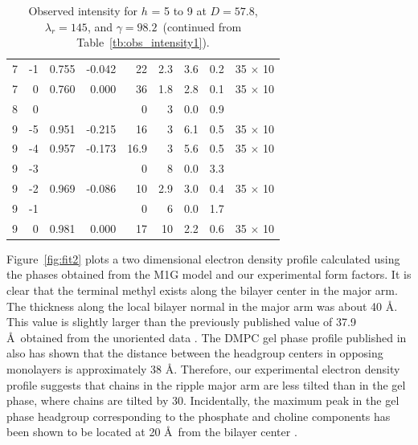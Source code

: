 \begin{table}[htbp]
\begin{tabular}{rrrrrrrrc}
7     & -1    & 0.755 & -0.042 & 22    & 2.3   & 3.6   & 0.2   & 35 $\times$ 10 \\
7     & 0     & 0.760 & 0.000 & 36    & 1.8   & 2.8   & 0.1   & 35 $\times$ 10 \\
8     & 0     &       &       & 0     & 3     & 0.0   & 0.9   &  \\
9     & -5    & 0.951 & -0.215 & 16    & 3     & 6.1   & 0.5   & 35 $\times$ 10 \\
9     & -4    & 0.957 & -0.173 & 16.9  & 3     & 5.6   & 0.5   & 35 $\times$ 10 \\
9     & -3    &       &       & 0     & 8     & 0.0   & 3.3   &  \\
9     & -2    & 0.969 & -0.086 & 10    & 2.9   & 3.0   & 0.4   & 35 $\times$ 10 \\
9     & -1    &       &       & 0     & 6     & 0.0   & 1.7   &  \\
9     & 0     & 0.981 & 0.000 & 17    & 10    & 2.2   & 0.6   & 35 $\times$ 10 \\
    \hline
  \end{tabular}
  \caption{Observed intensity for $h$ = 5 to 9 at $D=57.8$, $\lambda_r=145$, and 
  $\gamma=98.2$\textdegree\ (continued from Table~\ref{tb:obs_intensity1}).}
  \label{tb:obs_intensity2}
\end{table}

Figure~\ref{fig:fit2} plots a two dimensional electron density profile calculated
using the phases obtained from the M1G model and our experimental form factors.
It is clear that the terminal methyl exists along the bilayer 
center in the major arm. The thickness along the local bilayer normal
in the major arm was about 40 \AA. This value is slightly larger than
the previously published value of 37.9 \AA\ obtained from the unoriented
data \cite{ref:Sun96}. The DMPC gel phase profile published in 
\cite{Tristram-Nagle02} also has shown that the distance between
the headgroup centers in opposing monolayers is approximately 38 \AA.
Therefore, our experimental
electron density profile suggests that chains in the ripple major arm are
less tilted than in the gel phase, where chains are tilted by 30\textdegree.
Incidentally, the maximum peak in the gel phase headgroup corresponding to the
phosphate and choline components has been shown to be located at 20 \AA\
from the bilayer center \cite{Tristram-Nagle02}. 


